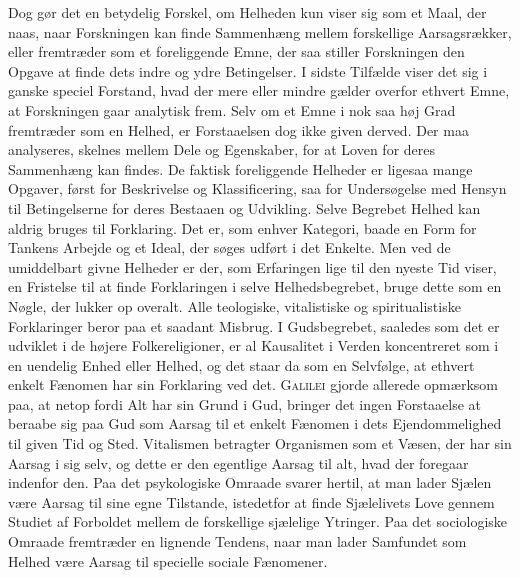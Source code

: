 \documentclass[12pt]{article}
\begin{document}
Dog gør det en betydelig Forskel, om Helheden kun viser sig som et Maal,
der naas, naar Forskningen kan finde Sammenhæng mellem forskellige Aarsagsrækker,
eller fremtræder som et foreliggende Emne, der saa stiller Forskningen den
Opgave at finde dets indre og ydre Betingelser. I sidste Tilfælde viser det sig i
ganske speciel Forstand, hvad der mere eller mindre gælder overfor ethvert Emne,
at Forskningen gaar analytisk frem. Selv om et Emne i nok saa høj Grad
fremtræder som en Helhed, er Forstaaelsen dog ikke given derved. Der maa analyseres,
skelnes mellem Dele og Egenskaber, for at Loven for deres Sammenhæng kan findes.
De faktisk foreliggende Helheder er ligesaa mange Opgaver, først for Beskrivelse
og Klassificering, saa for Undersøgelse med Hensyn til Betingelserne for deres
Bestaaen og Udvikling. Selve Begrebet Helhed kan aldrig bruges til Forklaring.
Det er, som enhver Kategori, baade en Form for Tankens Arbejde og et Ideal, der
søges udført i det Enkelte. Men ved de umiddelbart givne Helheder er der, som
Erfaringen lige til den nyeste Tid viser, en Fristelse til at finde Forklaringen i selve
Helhedsbegrebet, bruge dette som en Nøgle, der lukker op overalt. Alle teologiske,
vitalistiske og spiritualistiske Forklaringer beror paa et saadant Misbrug. I
Gudsbegrebet, saaledes som det er udviklet i de højere Folkereligioner, er al Kausalitet
i Verden koncentreret som i en uendelig Enhed eller Helhed, og det staar da som
en Selvfølge, at ethvert enkelt Fænomen har sin Forklaring ved det. \textsc{Galilei} gjorde
allerede opmærksom paa, at netop fordi Alt har sin Grund i Gud, bringer det ingen
Forstaaelse at beraabe sig paa Gud som Aarsag til et enkelt Fænomen i dets
Ejendommelighed til given Tid og Sted. Vitalismen betragter Organismen som et Væsen,
der har sin Aarsag i sig selv, og dette er den egentlige Aarsag til alt, hvad der
foregaar indenfor den. Paa det psykologiske Omraade svarer hertil, at man lader
Sjælen være Aarsag til sine egne Tilstande, istedetfor at finde Sjælelivets Love
gennem Studiet af Forboldet mellem de forskellige sjælelige Ytringer. Paa det
sociologiske Omraade fremtræder en lignende Tendens, naar man lader Samfundet som
Helhed være Aarsag til specielle sociale Fænomener.
\end{document}
